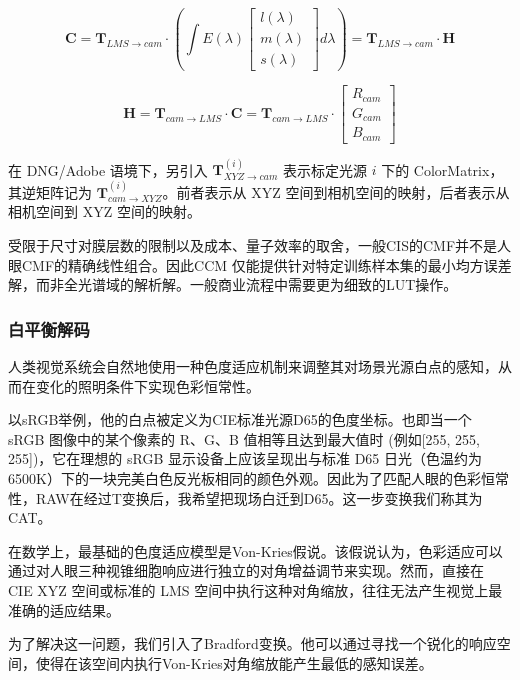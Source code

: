 \documentclass[journal]{IEEEtran}
\begin{document}
\[
\mathbf{C} = \mathbf{T}_{LMS\to cam} \cdot \left( \int E(\lambda) \begin{bmatrix} l(\lambda) \\ m(\lambda) \\ s(\lambda) \end{bmatrix} d\lambda \right) = \mathbf{T}_{LMS\to cam} \cdot \mathbf{H}
\]

\[
\mathbf{H} = \mathbf{T}_{cam\to LMS} \cdot \mathbf{C}
= \mathbf{T}_{cam\to LMS}\cdot \begin{bmatrix} R_{cam} \\ G_{cam} \\ B_{cam} \end{bmatrix}
\]


在 DNG/Adobe 语境下，另引入 $\mathbf{T}^{(i)}_{XYZ\to cam}$ 表示标定光源 $i$ 下的 ColorMatrix，其逆矩阵记为 $\mathbf{T}^{(i)}_{cam\to XYZ}$。前者表示从 XYZ 空间到相机空间的映射，后者表示从相机空间到 XYZ 空间的映射。

受限于尺寸对膜层数的限制以及成本、量子效率的取舍，一般CIS的CMF并不是人眼CMF的精确线性组合。因此CCM 仅能提供针对特定训练样本集的最小均方误差解，而非全光谱域的解析解。一般商业流程中需要更为细致的LUT操作。

\subsubsection{白平衡解码}


人类视觉系统会自然地使用一种色度适应机制来调整其对场景光源白点的感知，从而在变化的照明条件下实现色彩恒常性。

以sRGB举例，他的白点被定义为CIE标准光源D65的色度坐标。也即当一个 sRGB 图像中的某个像素的 R、G、B 值相等且达到最大值时 (例如[255, 255, 255])，它在理想的 sRGB 显示设备上应该呈现出与标准 D65 日光（色温约为 6500K）下的一块完美白色反光板相同的颜色外观。因此为了匹配人眼的色彩恒常性，RAW在经过T变换后，我希望把现场白迁到D65。这一步变换我们称其为CAT。

在数学上，最基础的色度适应模型是Von-Kries假说。该假说认为，色彩适应可以通过对人眼三种视锥细胞响应进行独立的对角增益调节来实现。然而，直接在 CIE XYZ 空间或标准的 LMS 空间中执行这种对角缩放，往往无法产生视觉上最准确的适应结果。

为了解决这一问题，我们引入了Bradford变换。他可以通过寻找一个锐化的响应空间，使得在该空间内执行Von-Kries对角缩放能产生最低的感知误差。
\end{document}
